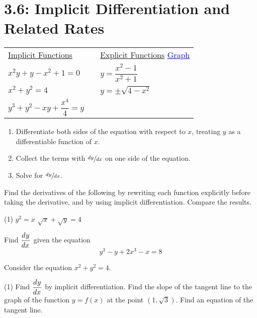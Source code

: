 \documentclass[../mathNotesPreamble]{subfiles}
\begin{document}
  \section{3.6: Implicit Differentiation and Related Rates}
  
  \begin{tabularx}{\linewidth}{
    >{\hsize}Z
    >{\hsize}X
    >{\hsize}X}
    \underline{Implicit Functions} & & \underline{Explicit Functions} \hfill \href{https://www.desmos.com/calculator/gxlimjndt8}{\textcolor{blue}{\underline{Graph}}}\\[\baselineskip]
    $x^2y+y-x^2+1=0$&  & $y=\dfrac{x^2-1}{x^2+1}$\\[2\baselineskip]
    $x^2+y^2=4$ & & $y=\pm\sqrt{4-x^2}$\\[2\baselineskip]
    $y^3+y^2-xy+\dfrac{x^4}{4}=y$&
  \end{tabularx}
  \pagebreak

  \begin{thmBox*}
    \begin{enumerate}
      \item Differentiate both sides of the equation with respect to $x$, treating $y$ as a \newline differentiable function of $x$.
      \item Collect the terms with $\sfrac{dy}{dx}$ on one side of the equation.
      \item Solve for $\sfrac{dy}{dx}$.
    \end{enumerate}
  \end{thmBox*}
  \begin{ex*}
    Find the derivatives of the following by rewriting each function explicitly before taking the derivative, and by using implicit differentiation. Compare the results.
  \end{ex*}
  \begin{extasks}[after-item-skip=\stretch{1}](1)
    \task $y^2=x$
    \task $\sqrt x+\sqrt y=4$
  \end{extasks}
  \pagebreak

  \begin{ex*}
    Find $\displaystyle{\frac{d^{}y}{dx^{}}}$ given the equation
    \[y^3-y+2x^3-x=8\]
  \end{ex*}
  \pagebreak
  
  \begin{ex*}
    Consider the equation $x^2+y^2=4$.
  \end{ex*}
  \begin{extasks}[after-item-skip=\stretch{1}](1)
    \task Find $\displaystyle{\frac{d^{}y}{dx^{}}}$ by implicit differentiation.
    \task Find the slope of the tangent line to the graph of the function $y=f(x)$ at the point $(1,\sqrt{3})$.
    \task Find an equation of the tangent line. 
  \end{extasks}
  \pagebreak
\end{document}
